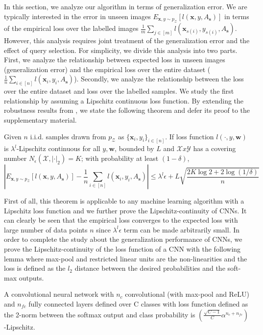 In this section, we analyze our algorithm in terms of generalization error.  We are typically interested in the error in unseen images $E_{\mathbf{x},y \sim p_\mathcal{Z}}[l(\mathbf{x},y,A_{\mathbf{s}})]$ in terms of the empirical loss over the labelled images $\frac{1}{m}\sum_{j\in[m]} l(\mathbf{x}_{s(i)},y_{s(i)},A_{\mathbf{s}})$. However, this analysis requires joint treatment of the generalization error and the effect of query selection. For simplicity, we divide this analysis into two parts. First, we analyze the relationship between expected loss in unseen images (generalization error) and the empirical loss over the entire dataset ($\frac{1}{n}\sum_{i\in [n]} l(\mathbf{x}_i,y_i,A_\mathbf{s})$). Secondly, we analyze the relationship between the loss over the entire dataset and loss over the labelled samples. We study the first relationship by assuming a Lipschitz continuous loss function. By extending the robustness results from \cite{robust}, we state the following theorem and defer its proof to the supplementary material.

\begin{theorem}
Given $n$ i.i.d. samples drawn from $p_\mathcal{Z}$ as $\{\mathbf{x}_i,y_i\}_{i\in[n]}$. If loss function $l(\cdot,y,\mathbf{w})$ is $\lambda^l$-Lipschitz continuous for all $y, \mathbf{w}$, bounded by $L$ and $\mathcal{X}x\mathcal{Y}$ has a covering number $N_{\epsilon}(\mathcal{X},|\cdot|_2)=K$; with probability at least $(1-\delta)$,
\[
\left|E_{\mathbf{x},y \sim p_\mathcal{Z}}[l(\mathbf{x},y, A_\mathbf{s})] - \frac{1}{n}\sum_{i\in[n]} l(\mathbf{x}_i,y_i,A_\mathbf{s})\right|  \leq  \lambda^l \epsilon + L \sqrt{\frac{2K\log 2 + 2\log (1/\delta)}{n}}
\]
\label{mainthm}
\end{theorem}

First of all, this theorem is applicable to any machine learning algorithm with a Lipschitz loss function and we further prove the Lipschitz-continuity of CNNs. It can clearly be seen that the empirical loss converges to the expected loss with large number of data points $n$ since $\lambda^l\epsilon$ term can be made arbitrarily small. In order to complete the study about the generalization performance of CNNs, we prove the Lipschitz-continuity of the loss function of a CNN with the following lemma where max-pool and restricted linear units are the non-linearities and the loss is defined as the $l_2$ distance between the desired probabilities and the soft-max outputs.

\begin{lemma}
A convolutional neural network with $n_c$ convolutional (with max-pool and ReLU) and $n_{fc}$ fully connected layers defined over C classes with loss function defined as the 2-norm between the softmax output and class probability is $\left(\frac{\sqrt{C-1}}{C} \alpha^{n_c+n_{fc}}\right)$-Lipschitz.
\end{lemma}

